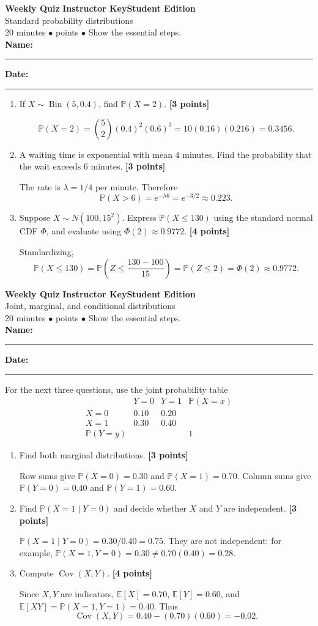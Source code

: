 \documentclass[11pt]{article}
\newcounter{quiznum}
\newcommand{\E}{\mathbb E}
\newcommand{\Cov}{\operatorname{Cov}}
\newcommand{\Prob}{\mathbb P}
\newcommand{\edition}{\ifanswers Instructor Key\else Student Edition\fi}
\newcommand{\points}[1]{\hfill{\small\color{rose}\textbf{[#1 points]}}}
\newcommand{\quizheading}[1]{%
  \clearpage\stepcounter{quiznum}%
  \begin{tcolorbox}[
    enhanced,colback=paper,colframe=indigo,boxrule=1.1pt,arc=2mm,
    left=4mm,right=4mm,top=2.5mm,bottom=2.5mm,
    borderline west={4pt}{0pt}{violet}]
    {\Large\bfseries\color{indigo}Weekly Quiz \thequiznum}\hfill
    {\bfseries\color{violet}\edition}\\[-1pt]
    {\large\color{ink}#1}\\[2pt]
    {\small\color{muted}20 minutes \quad $\bullet$ \quad 10 points \quad $\bullet$ \quad Show the essential steps.}
    \ifanswers\else
      \\[5pt]\textbf{Name:}\ \rule{0.48\linewidth}{0.4pt}\hfill
      \textbf{Date:}\ \rule{0.20\linewidth}{0.4pt}
    \fi
  \end{tcolorbox}
}
\begin{document}
\quizheading{Standard probability distributions}
\begin{enumerate}
  \item If $X\sim\operatorname{Bin}(5,0.4)$, find $\Prob(X=2)$. \points{3}
  \begin{solution}[1.15in]
    \[
      \Prob(X=2)=\binom52(0.4)^2(0.6)^3
      =10(0.16)(0.216)=0.3456.
    \]
  \end{solution}

  \item A waiting time is exponential with mean $4$ minutes. Find the probability
  that the wait exceeds $6$ minutes. \points{3}
  \begin{solution}[1.2in]
    The rate is $\lambda=1/4$ per minute. Therefore
    \[
      \Prob(X>6)=e^{-\lambda6}=e^{-3/2}\approx0.223.
    \]
  \end{solution}

  \item Suppose $X\sim N(100,15^2)$. Express $\Prob(X\le130)$ using the standard
  normal CDF $\Phi$, and evaluate using $\Phi(2)\approx0.9772$. \points{4}
  \begin{solution}[1.4in]
    Standardizing,
    \[
      \Prob(X\le130)=\Prob\left(Z\le\frac{130-100}{15}\right)
      =\Prob(Z\le2)=\Phi(2)\approx0.9772.
    \]
  \end{solution}
\end{enumerate}

\quizheading{Joint, marginal, and conditional distributions}
For the next three questions, use the joint probability table
\[
\begin{array}{c|cc|c}
 &Y=0&Y=1&\Prob(X=x)\\ \hline
X=0&0.10&0.20& \\
X=1&0.30&0.40& \\ \hline
\Prob(Y=y)&&&1
\end{array}
\]
\begin{enumerate}
  \item Find both marginal distributions. \points{3}
  \begin{solution}[0.9in]
    Row sums give $\Prob(X=0)=0.30$ and $\Prob(X=1)=0.70$. Column sums give
    $\Prob(Y=0)=0.40$ and $\Prob(Y=1)=0.60$.
  \end{solution}

  \item Find $\Prob(X=1\mid Y=0)$ and decide whether $X$ and $Y$ are independent.
  \points{3}
  \begin{solution}[1.05in]
    $\Prob(X=1\mid Y=0)=0.30/0.40=0.75$. They are not independent: for example,
    $\Prob(X=1,Y=0)=0.30\ne0.70(0.40)=0.28$.
  \end{solution}

  \item Compute $\Cov(X,Y)$. \points{4}
  \begin{solution}[1.15in]
    Since $X,Y$ are indicators, $\E[X]=0.70$, $\E[Y]=0.60$, and
    $\E[XY]=\Prob(X=1,Y=1)=0.40$. Thus
    \[
      \Cov(X,Y)=0.40-(0.70)(0.60)=-0.02.
    \]
  \end{solution}
\end{enumerate}
\end{document}
